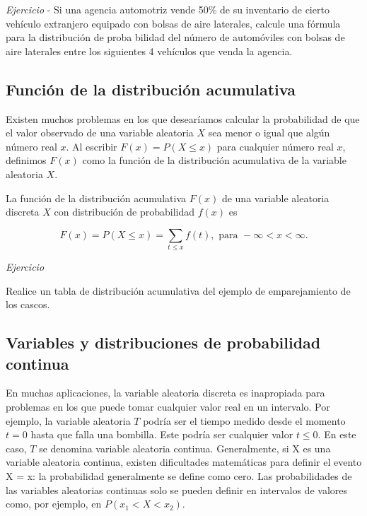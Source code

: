 \documentclass[11pt]{article}
\begin{document}
\emph{Ejercicio} - Si una agencia automotriz vende 50\% de su inventario
de cierto vehículo extranjero equipado con bolsas de aire laterales,
calcule una fórmula para la distribución de proba bilidad del número de
automóviles con bolsas de aire laterales entre los siguientes 4
vehículos que venda la agencia.

\hypertarget{funciuxf3n-de-la-distribuciuxf3n-acumulativa}{%
\subsection{Función de la distribución
acumulativa}\label{funciuxf3n-de-la-distribuciuxf3n-acumulativa}}

Existen muchos problemas en los que desearíamos calcular la probabilidad
de que el valor observado de una variable aleatoria \(X\) sea menor o
igual que algún número real \(x\). Al escribir \(F(x) = P(X \leq x)\)
para cualquier número real \(x\), definimos \(F(x)\) como la función de
la distribución acumulativa de la variable aleatoria \(X\).

La función de la distribución acumulativa \(F(x)\) de una variable
aleatoria discreta \(X\) con distribución de probabilidad \(f(x)\) es

\[
F(x ) = P (X\leq x ) = \sum_{t\leq x} f (t), \text{  para  } -\infty < x < \infty.
\]

\emph{Ejercicio}

Realice un tabla de distribución acumulativa del ejemplo de
emparejamiento de los cascos.

\hypertarget{variables-y-distribuciones-de-probabilidad-continua}{%
\subsection{Variables y distribuciones de probabilidad
continua}\label{variables-y-distribuciones-de-probabilidad-continua}}

En muchas aplicaciones, la variable aleatoria discreta es inapropiada
para problemas en los que puede tomar cualquier valor real en un
intervalo. Por ejemplo, la variable aleatoria \(T\) podría ser el tiempo
medido desde el momento \(t = 0\) hasta que falla una bombilla. Este
podría ser cualquier valor \(t \leq 0\). En este caso, \(T\) se denomina
variable aleatoria continua. Generalmente, si X es una variable
aleatoria continua, existen dificultades matemáticas para definir el
evento X = x: la probabilidad generalmente se define como cero. Las
probabilidades de las variables aleatorias continuas solo se pueden
definir en intervalos de valores como, por ejemplo, en
\(P (x_{1} <X <x_{2})\).
\end{document}
